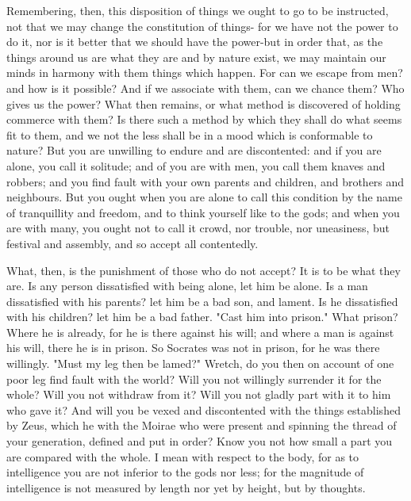 \documentclass[a4paper]{article}
\begin{document}
Remembering, then, this disposition of things we ought to go to be
instructed, not that we may change the constitution of things- for
we have not the power to do it, nor is it better that we should have
the power-but in order that, as the things around us are what they
are and by nature exist, we may maintain our minds in harmony with
them things which happen. For can we escape from men? and how is it
possible? And if we associate with them, can we chance them? Who gives
us the power? What then remains, or what method is discovered of holding
commerce with them? Is there such a method by which they shall do
what seems fit to them, and we not the less shall be in a mood which
is conformable to nature? But you are unwilling to endure and are
discontented: and if you are alone, you call it solitude; and of you
are with men, you call them knaves and robbers; and you find fault
with your own parents and children, and brothers and neighbours. But
you ought when you are alone to call this condition by the name of
tranquillity and freedom, and to think yourself like to the gods;
and when you are with many, you ought not to call it crowd, nor trouble,
nor uneasiness, but festival and assembly, and so accept all contentedly.

What, then, is the punishment of those who do not accept? It is to
be what they are. Is any person dissatisfied with being alone, let
him be alone. Is a man dissatisfied with his parents? let him be a
bad son, and lament. Is he dissatisfied with his children? let him
be a bad father. "Cast him into prison." What prison? Where he is
already, for he is there against his will; and where a man is against
his will, there he is in prison. So Socrates was not in prison, for
he was there willingly. "Must my leg then be lamed?" Wretch, do you
then on account of one poor leg find fault with the world? Will you
not willingly surrender it for the whole? Will you not withdraw from
it? Will you not gladly part with it to him who gave it? And will
you be vexed and discontented with the things established by Zeus,
which he with the Moirae who were present and spinning the thread
of your generation, defined and put in order? Know you not how small
a part you are compared with the whole. I mean with respect to the
body, for as to intelligence you are not inferior to the gods nor
less; for the magnitude of intelligence is not measured by length
nor yet by height, but by thoughts. 
\end{document}
